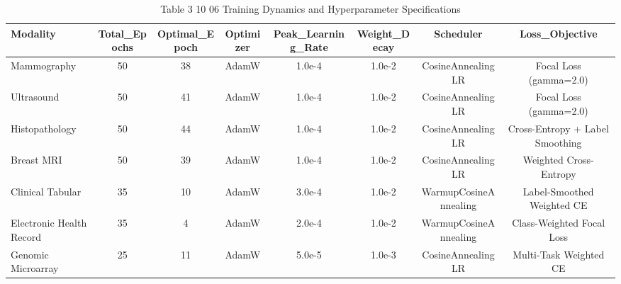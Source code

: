 \begin{table}[htbp]
\centering
\small
\begin{tabular}{lccccccc}
\hline
Modality & Total\_Epochs & Optimal\_Epoch & Optimizer & Peak\_Learning\_Rate & Weight\_Decay & Scheduler & Loss\_Objective \\
\hline
Mammography & 50 & 38 & AdamW & 1.0e-4 & 1.0e-2 & CosineAnnealingLR & Focal Loss (gamma=2.0) \\
Ultrasound & 50 & 41 & AdamW & 1.0e-4 & 1.0e-2 & CosineAnnealingLR & Focal Loss (gamma=2.0) \\
Histopathology & 50 & 44 & AdamW & 1.0e-4 & 1.0e-2 & CosineAnnealingLR & Cross-Entropy + Label Smoothing \\
Breast MRI & 50 & 39 & AdamW & 1.0e-4 & 1.0e-2 & CosineAnnealingLR & Weighted Cross-Entropy \\
Clinical Tabular & 35 & 10 & AdamW & 3.0e-4 & 1.0e-2 & WarmupCosineAnnealing & Label-Smoothed Weighted CE \\
Electronic Health Record & 35 & 4 & AdamW & 2.0e-4 & 1.0e-2 & WarmupCosineAnnealing & Class-Weighted Focal Loss \\
Genomic Microarray & 25 & 11 & AdamW & 5.0e-5 & 1.0e-3 & CosineAnnealingLR & Multi-Task Weighted CE \\
\hline
\end{tabular}
\caption{Table 3 10 06 Training Dynamics and Hyperparameter Specifications}
\label{tab:table_3_10_06_training_dynamics_and_hyperparameter_specifications}
\end{table}
